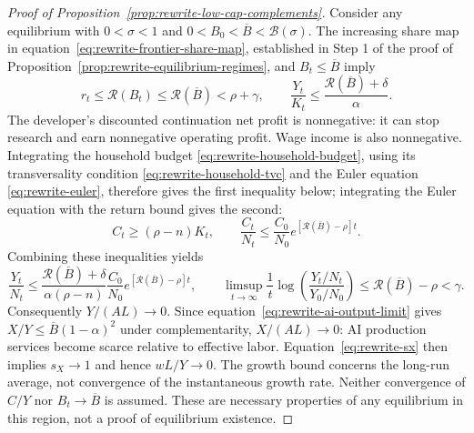 \begin{proof}[Proof of Proposition~\ref{prop:rewrite-low-cap-complements}]
\label{proof:rewrite-low-cap-complements}
Consider any equilibrium with $0<\sigma<1$ and
$0<B_0<\overline B<\mathcal B(\sigma)$. The increasing share map in
equation~\eqref{eq:rewrite-frontier-share-map}, established in Step 1 of the
proof of Proposition~\ref{prop:rewrite-equilibrium-regimes},
and $B_t\leq\overline B$ imply
\begin{equation}
 r_t\leq\mathcal R(B_t)\leq\mathcal R(\overline B)<\rho+\gamma,
 \qquad
 \frac{Y_t}{K_t}\leq\frac{\mathcal R(\overline B)+\delta}{\alpha}.
 \label{eq:rewrite-low-cap-return-bound}
\end{equation}
The developer's discounted continuation net profit is nonnegative: it can
stop research and earn nonnegative operating profit. Wage income is also
nonnegative. Integrating the household budget
\eqref{eq:rewrite-household-budget}, using its transversality condition
\eqref{eq:rewrite-household-tvc} and the Euler equation
\eqref{eq:rewrite-euler}, therefore gives the first inequality below;
integrating the Euler equation with the return bound gives the second:
\begin{equation}
 C_t\geq(\rho-n)K_t,
 \qquad
 \frac{C_t}{N_t}\leq\frac{C_0}{N_0}
 e^{[\mathcal R(\overline B)-\rho]t}.
 \label{eq:rewrite-low-cap-consumption-bound}
\end{equation}
Combining these inequalities yields
\begin{equation}
 \frac{Y_t}{N_t}\leq
 \frac{\mathcal R(\overline B)+\delta}{\alpha(\rho-n)}
 \frac{C_0}{N_0}e^{[\mathcal R(\overline B)-\rho]t},
 \qquad
 \limsup_{t\to\infty}\frac1t
 \log\left(\frac{Y_t/N_t}{Y_0/N_0}\right)
 \leq\mathcal R(\overline B)-\rho<\gamma.
 \label{eq:rewrite-low-cap-growth-bound}
\end{equation}
Consequently $Y/(AL)\to0$. Since equation~\eqref{eq:rewrite-ai-output-limit}
gives $X/Y\leq\overline B(1-\alpha)^2$ under complementarity,
$X/(AL)\to0$: AI production services become scarce relative to effective
labor. Equation~\eqref{eq:rewrite-sx} then implies $s_X\to1$ and hence
$wL/Y\to0$.
The growth bound concerns the long-run average, not convergence of the
instantaneous growth rate. Neither convergence of $C/Y$ nor
$B_t\to\overline B$ is assumed. These are necessary properties of any
equilibrium in this region, not a proof of equilibrium existence.
\end{proof}
% 

